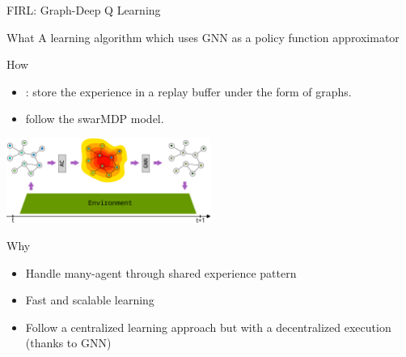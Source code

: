 \documentclass[presentation, 8pt,169]{beamer}\mode<presentation>{\usetheme{AMSBolognaFC}}
\begin{document}
\begin{frame}{FIRL: Graph-Deep Q Learning}
  \begin{block}{What}
    A learning algorithm which uses GNN as a policy function approximator
  \end{block}
  \begin{block}{How}
    \begin{itemize}
      \item {}: store the experience in a replay buffer under the form of graphs.
      \item {} follow the swarMDP model.
    \end{itemize}
    \centering
    \includegraphics[width=0.5\textwidth]{img/architecture.pdf}
  
  \end{block}
  \begin{alertblock}{Why}
    \begin{itemize}
      \item Handle many-agent through shared experience pattern 
      \item Fast and scalable learning 
      \item Follow a centralized learning approach but with a decentralized execution (thanks to GNN)
    \end{itemize}
  \end{alertblock}
\end{frame}
\end{document}
